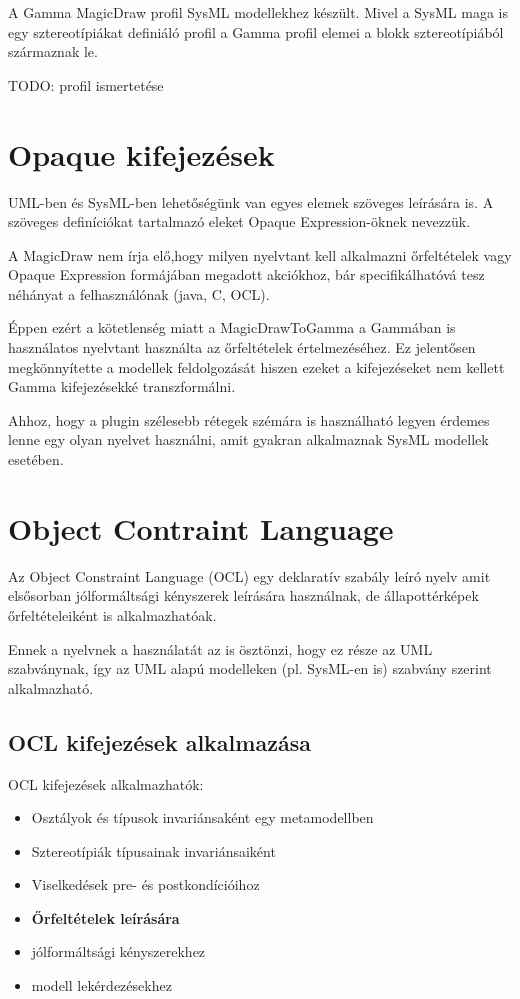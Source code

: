 A Gamma MagicDraw profil SysML modellekhez készült. Mivel a SysML maga is egy sztereotípiákat definiáló profil a Gamma profil elemei a blokk sztereotípiából származnak le.

TODO: profil ismertetése

\section{Opaque kifejezések}

UML-ben és SysML-ben lehetőségünk van egyes elemek szöveges leírására is. A szöveges definíciókat tartalmazó eleket Opaque Expression-öknek nevezzük.

A MagicDraw nem írja elő,hogy milyen nyelvtant kell alkalmazni őrfeltételek vagy Opaque Expression formájában megadott akciókhoz, bár specifikálhatóvá tesz néhányat a felhasználónak (java, C, OCL).

Éppen ezért a kötetlenség miatt a MagicDrawToGamma a Gammában is használatos nyelvtant használta az őrfeltételek értelmezéséhez. Ez jelentősen megkönnyítette a modellek feldolgozását hiszen ezeket a kifejezéseket nem kellett Gamma kifejezésekké transzformálni.

Ahhoz, hogy a plugin szélesebb rétegek szémára is használható legyen érdemes lenne egy olyan nyelvet használni, amit gyakran alkalmaznak SysML modellek esetében.

\section{Object Contraint Language}

Az Object Constraint Language (OCL) egy deklaratív szabály leíró nyelv amit elsősorban jólformáltsági kényszerek leírására használnak, de állapottérképek őrfeltételeiként is alkalmazhatóak.

Ennek a nyelvnek a használatát az is ösztönzi, hogy ez része az UML szabványnak, így az UML alapú modelleken (pl. SysML-en is) szabvány szerint alkalmazható.

\subsection{OCL kifejezések alkalmazása}

OCL kifejezések alkalmazhatók:

\begin{itemize}
	\item Osztályok és típusok invariánsaként egy metamodellben
	\item Sztereotípiák típusainak invariánsaiként
	\item Viselkedések pre- és postkondícióihoz
	\item \textbf{Őrfeltételek leírására}
	\item jólformáltsági kényszerekhez
	\item modell lekérdezésekhez
\end{itemize}

